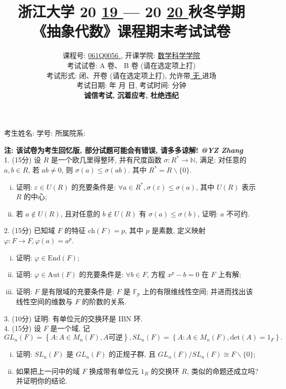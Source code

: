 \documentclass[UTF8]{ctexart}
\title{
\textbf{浙江大学 }20 \underline{ 19 } — 20 \underline{ 20 } \textbf{秋冬学期} \\
\textbf{《抽象代数》课程期末考试试卷}
}
\author{
课程号: \underline{ \quad 061Q0056 \quad }, 开课学院: \underline{ \quad 数学科学学院 \quad } \\
考试试卷: \checkmark A 卷、 B 卷 (请在选定项上打\checkmark) \\
考试形式: \checkmark 闭、开卷 (请在选定项上打\checkmark), 允许带\underline{ \quad 无 \quad  }进场 \\
考试日期: \underline{ \quad 2020 \quad } 年 \underline{ \quad 01 \quad } 月 \underline{ \quad 17 \quad } 日, 考试时间: \underline{ \quad 120 \quad }分钟 \\
\textbf{诚信考试, 沉着应考, 杜绝违纪}
}
\date{}
\begin{document}
\maketitle

\begin{center}
考生姓名: \underline{\quad\quad\quad\quad\quad\quad\quad\quad\quad}  学号: \underline{\quad\quad\quad\quad\quad\quad\quad\quad\quad}  所属院系: \underline{\quad\quad\quad\quad\quad\quad\quad\quad\quad}
\end{center}

\textbf{注: 该试卷为考生回忆版, 部分试题可能会有错误, 请多多谅解! \textit{@YZ Zhang}}
\\

1. (15分) 设 $R$ 是一个欧几里得整环, 并有尺度函数 $\sigma:R^*\rightarrow\mathbb{N}$, 满足: 对任意的 $a,b\in R$, 若 $ab\neq0$, 则 $\sigma(a)\le\sigma(ab)$. 其中 $R^*=R\backslash\{0\}$.
\begin{enumerate}[(i)]
  \item 证明: $\varepsilon\in U(R)$ 的充要条件是: $\forall a\in R^*, \sigma(\varepsilon)\le\sigma(a)$, 其中 $U(R)$ 表示 $R$ 的中心;
  \item 若 $a\notin U(R)$, 且对任意的 $b\notin U(R)$ 有 $\sigma(a)\le\sigma(b)$, 证明: $a$ 不可约.\\
\end{enumerate}

2. (15分) 已知域 $F$ 的特征 $\text{ch}(F)=p$, 其中 $p$ 是素数, 定义映射 $\varphi:F\rightarrow F, \varphi(a)=a^p$.
\begin{enumerate}[(i)]
  \item 证明: $\varphi\in\text{End}(F)$;
  \item 证明: $\varphi\in\text{Aut}(F)$ 的充要条件是: $\forall b\in F$, 方程 $x^p-b=0$ 在 $F$ 上有解;
  \item 证明: $F$ 是有限域的充要条件是: $F$ 是 $\mathbb{F}_p$ 上的有限维线性空间; 并进而找出该线性空间的维数与 $F$ 的阶数的关系.\\
\end{enumerate}

3. (10分) 证明: 有单位元的交换环是  IBN 环.
\\

4. (15分) 设 $F$ 是一个域, 记 \[\displaystyle GL_n(F)=\left\{A:A\in M_n(F), A\text{可逆}\right\}, SL_n(F)=
\left\{A:A\in M_n(F), \text{det}(A)=1_F\right\}.\]
\begin{enumerate}[(i)]
  \item 证明: $SL_n(F)$ 是 $GL_n(F)$ 的正规子群, 且 $GL_n(F)/SL_n(F)\cong F\backslash\{0\}$;
  \item 如果把上一问中的域 $F$ 换成带有单位元 $1_R$ 的交换环 $R$, 类似的命题还成立吗? 并证明你的结论.\\
\end{enumerate}
\end{document}

